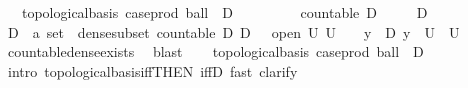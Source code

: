 \begin{isabellebody}
\ \ \ {\isachardoublequoteopen}topological{\isacharunderscore}{\kern0pt}basis\ {\isacharparenleft}{\kern0pt}case{\isacharunderscore}{\kern0pt}prod\ ball\ {\isacharbackquote}{\kern0pt}\ {\isacharparenleft}{\kern0pt}D\ {\isasymtimes}\ {\isacharparenleft}{\kern0pt}{\isasymrat}\ {\isasyminter}\ {\isacharbraceleft}{\kern0pt}{}{\isacharless}{\kern0pt}{\isachardot}{\kern0pt}{\isachardot}{\kern0pt}{\isacharbraceright}{\kern0pt}{\isacharparenright}{\kern0pt}{\isacharparenright}{\kern0pt}{\isacharparenright}{\kern0pt}{\isachardoublequoteclose}\isanewline
\ \ \ \ \ {\isachardoublequoteopen}countable\ D{\isachardoublequoteclose}\isanewline
\ \ \ \ \ {\isachardoublequoteopen}D\ {\isasymnoteq}\ {\isacharbraceleft}{\kern0pt}{\isacharbraceright}{\kern0pt}{\isachardoublequoteclose}\ \ \ \ \isanewline
%
\isadelimproof
%
\endisadelimproof
%
\isatagproof
{}\isamarkupfalse%
\ {\isacharminus}{\kern0pt}\isanewline
\ \ \isamarkupfalse%
\ D\ {\isacharcolon}{\kern0pt}{\isacharcolon}{\kern0pt}\ {\isachardoublequoteopen}{\isacharprime}{\kern0pt}a\ set{\isachardoublequoteclose}\ \ dense{\isacharunderscore}{\kern0pt}subset{\isacharcolon}{\kern0pt}\ {\isachardoublequoteopen}countable\ D{\isachardoublequoteclose}\ {\isachardoublequoteopen}D\ {\isasymnoteq}\ {\isacharbraceleft}{\kern0pt}{\isacharbraceright}{\kern0pt}{\isachardoublequoteclose}\ {\isachardoublequoteopen}{\isasymlbrakk}open\ U{\isacharsemicolon}{\kern0pt}\ U\ {\isasymnoteq}\ {\isacharbraceleft}{\kern0pt}{\isacharbraceright}{\kern0pt}{\isasymrbrakk}\ {\isasymLongrightarrow}\ {\isasymexists}y\ {\isasymin}\ D{\isachardot}{\kern0pt}\ y\ {\isasymin}\ U{\isachardoublequoteclose}\ \ U\ \isamarkupfalse%
\ countable{\isacharunderscore}{\kern0pt}dense{\isacharunderscore}{\kern0pt}exists\ \isamarkupfalse%
\ blast\isanewline
\ \ \isamarkupfalse%
\ {\isachardoublequoteopen}topological{\isacharunderscore}{\kern0pt}basis\ {\isacharparenleft}{\kern0pt}case{\isacharunderscore}{\kern0pt}prod\ ball\ {\isacharbackquote}{\kern0pt}\ {\isacharparenleft}{\kern0pt}D\ {\isasymtimes}\ {\isacharparenleft}{\kern0pt}{\isasymrat}\ {\isasyminter}\ {\isacharbraceleft}{\kern0pt}{}{\isacharless}{\kern0pt}{\isachardot}{\kern0pt}{\isachardot}{\kern0pt}{\isacharbraceright}{\kern0pt}{\isacharparenright}{\kern0pt}{\isacharparenright}{\kern0pt}{\isacharparenright}{\kern0pt}{\isachardoublequoteclose}\isanewline
\ \ \isamarkupfalse%
\ {\isacharparenleft}{\kern0pt}intro\ topological{\isacharunderscore}{\kern0pt}basis{\isacharunderscore}{\kern0pt}iff{\isacharbrackleft}{\kern0pt}THEN\ iffD{}{\isacharbrackright}{\kern0pt}{\isacharcomma}{\kern0pt}\ fast{\isacharcomma}{\kern0pt}\ clarify{\isacharparenright}{\kern0pt}\isanewline

\end{isabellebody}
